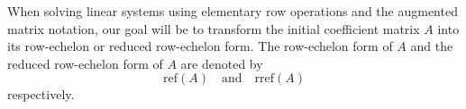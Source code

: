 \documentclass{ximera}
\begin{document}
 
 

When solving linear systems using elementary row operations and the augmented matrix notation, our goal will be to transform the initial coefficient matrix $A$ into its row-echelon or reduced row-echelon form.  The row-echelon form of $A$ and the reduced row-echelon form of $A$ are denoted by 
$$\mbox{ref}(A)\quad\text{and}\quad\mbox{rref}(A)$$
respectively.
\end{document}
